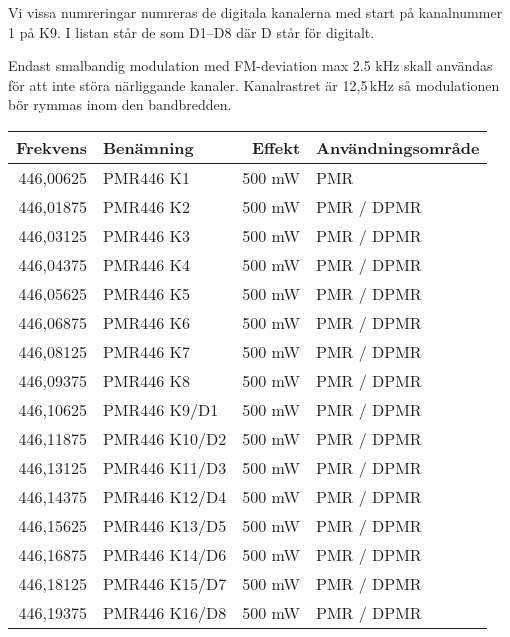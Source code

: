 Vi vissa numreringar numreras de digitala kanalerna med start på kanalnummer 1 på K9. I listan står de som D1--D8 där D står för digitalt.

Endast smalbandig modulation med FM-deviation max 2.5 kHz skall användas för att inte störa närliggande kanaler. Kanalrastret är 12,5\,kHz så modulationen bör rymmas inom den bandbredden.
 
\begin{longtable}{rlrl}
	 \textbf{Frekvens} & \textbf{Benämning} & \textbf{Effekt} & \textbf{Användningsområde} \\ \hline
	\endhead
446,00625 & PMR446 K1          &          500 mW & PMR                    \\
	         446,01875 & PMR446 K2          &          500 mW & PMR / DPMR                 \\
	         446,03125 & PMR446 K3          &          500 mW & PMR / DPMR                 \\
	         446,04375 & PMR446 K4          &          500 mW & PMR / DPMR                 \\
	         446,05625 & PMR446 K5          &          500 mW & PMR / DPMR                 \\
	         446,06875 & PMR446 K6          &          500 mW & PMR / DPMR                 \\
	         446,08125 & PMR446 K7          &          500 mW & PMR / DPMR                 \\
	         446,09375 & PMR446 K8          &          500 mW & PMR / DPMR                 \\ \hline
	         446,10625 & PMR446 K9/D1       &          500 mW & PMR / DPMR                 \\
	         446,11875 & PMR446 K10/D2      &          500 mW & PMR / DPMR                 \\
	         446,13125 & PMR446 K11/D3      &          500 mW & PMR / DPMR                 \\
	         446,14375 & PMR446 K12/D4      &          500 mW & PMR / DPMR                 \\
	         446,15625 & PMR446 K13/D5      &          500 mW & PMR / DPMR                 \\
	         446,16875 & PMR446 K14/D6      &          500 mW & PMR / DPMR                 \\
	         446,18125 & PMR446 K15/D7      &          500 mW & PMR / DPMR                 \\
	         446,19375 & PMR446 K16/D8      &          500 mW & PMR / DPMR
\end{longtable}

